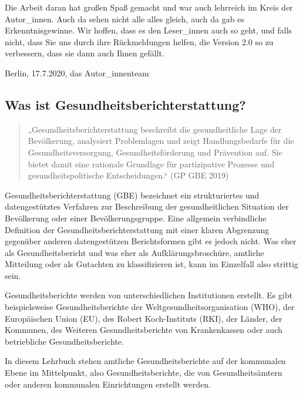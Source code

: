 \documentclass{article}
\begin{document}
Die Arbeit daran hat großen Spaß gemacht und war auch lehrreich im Kreis der Autor\_innen. Auch da sehen nicht alle alles gleich, auch da gab es Erkenntnisgewinne. Wir hoffen, dass es den Leser\_innen auch so geht, und falls nicht, dass Sie uns durch ihre Rückmeldungen helfen, die Version 2.0 so zu verbessern, dass sie dann auch Ihnen gefällt.


Berlin, 17.7.2020, das Autor\_innenteam





\subsection{Was ist Gesundheitsberichterstattung?}\label{H5307720}


\begin{quote}



„Gesundheitsberichterstattung beschreibt die gesundheitliche Lage der Bevölkerung, analysiert Problemlagen und zeigt Handlungsbedarfe für die Gesundheitsversorgung, Gesundheitsförderung und Prävention auf. Sie bietet damit eine rationale Grundlage für partizipative Prozesse und gesundheitspolitische Entscheidungen.“ (GP GBE 2019) 




\end{quote}


Gesundheitsberichterstattung (GBE) bezeichnet ein strukturiertes und datengestütztes Verfahren zur Beschreibung der gesundheitlichen Situation der Bevölkerung oder einer Bevölkerungsgruppe. Eine allgemein verbindliche Definition der Gesundheitsberichterstattung mit einer klaren Abgrenzung gegenüber anderen datengestützen Berichtsformen gibt es jedoch nicht. Was eher als Gesundheitsbericht und was eher als Aufklärungsbroschüre, amtliche Mitteilung oder als Gutachten zu klassifizieren ist, kann im Einzelfall also strittig sein. 


Gesundheitsberichte werden von unterschiedlichen Institutionen erstellt. Es gibt beispielsweise Gesundheitsberichte der Weltgesundheitsorganisation (WHO), der Europäischen Union (EU), des Robert Koch-Instituts (RKI), der Länder, der Kommunen, des Weiteren Gesundheitsberichte von Krankenkassen oder auch betriebliche Gesundheitsberichte. 


In diesem Lehrbuch stehen amtliche Gesundheitsberichte auf der kommunalen Ebene im Mittelpunkt, also Gesundheitsberichte, die von Gesundheitsämtern oder anderen kommunalen Einrichtungen erstellt werden.
\end{document}

